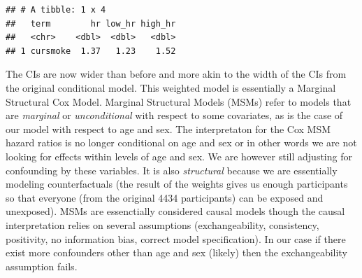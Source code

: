 \documentclass[
]{book}
\newenvironment{Shaded}{\begin{snugshade}}{\end{snugshade}}
\newcommand{\DataTypeTok}[1]{\textcolor[rgb]{0.13,0.29,0.53}{#1}}
\newcommand{\FloatTok}[1]{\textcolor[rgb]{0.00,0.00,0.81}{#1}}
\newcommand{\KeywordTok}[1]{\textcolor[rgb]{0.13,0.29,0.53}{\textbf{#1}}}
\newcommand{\NormalTok}[1]{#1}
\newcommand{\OperatorTok}[1]{\textcolor[rgb]{0.81,0.36,0.00}{\textbf{#1}}}
\newcommand{\StringTok}[1]{\textcolor[rgb]{0.31,0.60,0.02}{#1}}
\begin{document}
\begin{Shaded}
\end{Shaded}

\begin{verbatim}
## # A tibble: 1 x 4
##   term        hr low_hr high_hr
##   <chr>    <dbl>  <dbl>   <dbl>
## 1 cursmoke  1.37   1.23    1.52
\end{verbatim}

The CIs are now wider than before and more akin to the width of the CIs from the original conditional model. This weighted model is essentially a Marginal Structural Cox Model. Marginal Structural Models (MSMs) refer to models that are \emph{marginal} or \emph{unconditional} with respect to some covariates, as is the case of our model with respect to age and sex. The interpretaton for the Cox MSM hazard ratios is no longer conditional on age and sex or in other words we are not looking for effects within levels of age and sex. We are however still adjusting for confounding by these variables. It is also \emph{structural} because we are essentially modeling counterfactuals (the result of the weights gives us enough participants so that everyone (from the original 4434 participants) can be exposed and unexposed). MSMs are essenctially considered causal models though the causal interpretation relies on several assumptions (exchangeability, consistency, positivity, no information bias, correct model specification). In our case if there exist more confounders other than age and sex (likely) then the exchangeability assumption fails.
\end{document}
